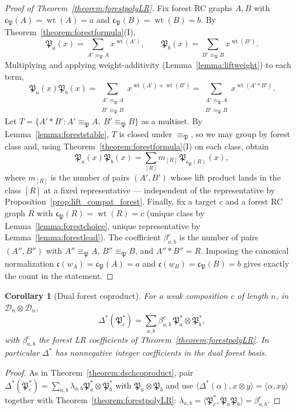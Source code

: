 \documentclass{amsart}
\newtheorem{corollary}[theorem]{Corollary}
\theoremstyle{definition}
\theoremstyle{remark}
\newcommand{\dcoma}{\mathcal{D}}
\newcommand{\forest}{\mathfrak{P}}
\newcommand{\code}{\mathfrak{c}}
\newcommand{\wtt}{\operatorname{wt}}
\newcommand{\wof}[1]{w_{#1}}
\begin{document}
\begin{proof}[Proof of Theorem~\ref{theorem:forestpolyLR}]
Fix forest RC graphs $A,B$ with $\code_{\forest}(A)=\wtt(A)=a$ and $\code_{\forest}(B)=\wtt(B)=b$. By Theorem~\ref{theorem:forestformula}(I),
\[
\forest_a(x)=\sum_{A'\equiv_{\forest}A}x^{\wtt(A')},\qquad \forest_b(x)=\sum_{B'\equiv_{\forest}B}x^{\wtt(B')}.
\]
Multiplying and applying weight-additivity (Lemma~\ref{lemma:liftweight}) to each term,
\[
\forest_a(x)\forest_b(x)=\sum_{\substack{A'\equiv_{\forest}A\\B'\equiv_{\forest}B}}x^{\wtt(A')+\wtt(B')}=\sum_{\substack{A'\equiv_{\forest}A\\B'\equiv_{\forest}B}}x^{\wtt(A'*B')}.
\]
Let $T=\{A'*B':A'\equiv_{\forest}A,\ B'\equiv_{\forest}B\}$ as a multiset. By Lemma~\ref{lemma:foreststable}, $T$ is closed under $\equiv_{\forest}$, so we may group by forest class and, using Theorem~\ref{theorem:forestformula}(I) on each class, obtain
\[
\forest_a(x)\forest_b(x)=\sum_{[R]}m_{[R]}\,\forest_{\code_{\forest}(R)}(x),
\]
where $m_{[R]}$ is the number of pairs $(A',B')$ whose lift product lands in the class $[R]$ at a fixed representative — independent of the representative by Proposition~\ref{prop:lift_compat_forest}. Finally, fix a target $c$ and a forest RC graph $R$ with $\code_{\forest}(R)=\wtt(R)=c$ (unique class by Lemma~\ref{lemma:forestchoice}, unique representative by Lemma~\ref{lemma:forestlead}). The coefficient $\beta_{a,b}^c$ is the number of pairs $(A'',B'')$ with $A''\equiv_{\forest}A$, $B''\equiv_{\forest}B$, and $A''*B''=R$. Imposing the canonical normalization $\code(\wof{A})=\code_{\forest}(A)=a$ and $\code(\wof{B})=\code_{\forest}(B)=b$ gives exactly the count in the statement.
\end{proof}

\begin{corollary}[Dual forest coproduct]\label{corollary:dforestcoproduct}
For a weak composition $c$ of length $n$, in $\dcoma_n\otimes\dcoma_n$,
\[
\Delta^*(\forest_c^*)=\sum_{a,b}\beta_{a,b}^c\,\forest_a^*\otimes\forest_b^*,
\]
with $\beta_{a,b}^c$ the forest LR coefficients of Theorem~\ref{theorem:forestpolyLR}. In particular $\Delta^*$ has nonnegative integer coefficients in the dual forest basis.
\end{corollary}
\begin{proof}
As in Theorem~\ref{theorem:dschcoproduct}, pair $\Delta^*(\forest_c^*)=\sum_{a,b}\lambda_{a,b}\forest_a^*\otimes\forest_b^*$ with $\forest_a\otimes\forest_b$ and use $\langle\Delta^*(\alpha),x\otimes y\rangle=\langle\alpha,xy\rangle$ together with Theorem~\ref{theorem:forestpolyLR}: $\lambda_{a,b}=\langle\forest_c^*,\forest_a\forest_b\rangle=\beta_{a,b}^c$.
\end{proof}
\end{document}

